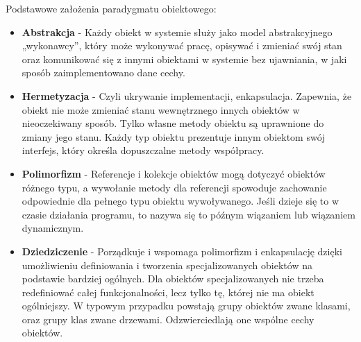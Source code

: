 \documentclass[../main.tex]{subfiles}
\begin{document}
Podstawowe założenia paradygmatu obiektowego:
\begin{itemize}
    \item \textbf{Abstrakcja} - Każdy obiekt w systemie służy jako model abstrakcyjnego „wykonawcy”, który może wykonywać pracę, opisywać i zmieniać swój stan oraz komunikować się z innymi obiektami w systemie bez ujawniania, w jaki sposób zaimplementowano dane cechy.
    \item \textbf{Hermetyzacja} - Czyli ukrywanie implementacji, enkapsulacja. Zapewnia, że obiekt nie może zmieniać stanu wewnętrznego innych obiektów w nieoczekiwany sposób. Tylko własne metody obiektu są uprawnione do zmiany jego stanu. Każdy typ obiektu prezentuje innym obiektom swój interfejs, który określa dopuszczalne metody współpracy.
    \item \textbf{Polimorfizm} - Referencje i kolekcje obiektów mogą dotyczyć obiektów różnego typu, a wywołanie metody dla referencji spowoduje zachowanie odpowiednie dla pełnego typu obiektu wywoływanego. Jeśli dzieje się to w czasie działania programu, to nazywa się to późnym wiązaniem lub wiązaniem dynamicznym.
    \item \textbf{Dziedziczenie} - Porządkuje i wspomaga polimorfizm i enkapsulację dzięki umożliwieniu definiowania i tworzenia specjalizowanych obiektów na podstawie bardziej ogólnych. Dla obiektów specjalizowanych nie trzeba redefiniować całej funkcjonalności, lecz tylko tę, której nie ma obiekt ogólniejszy. W typowym przypadku powstają grupy obiektów zwane klasami, oraz grupy klas zwane drzewami. Odzwierciedlają one wspólne cechy obiektów. 
\end{itemize}
\end{document}
